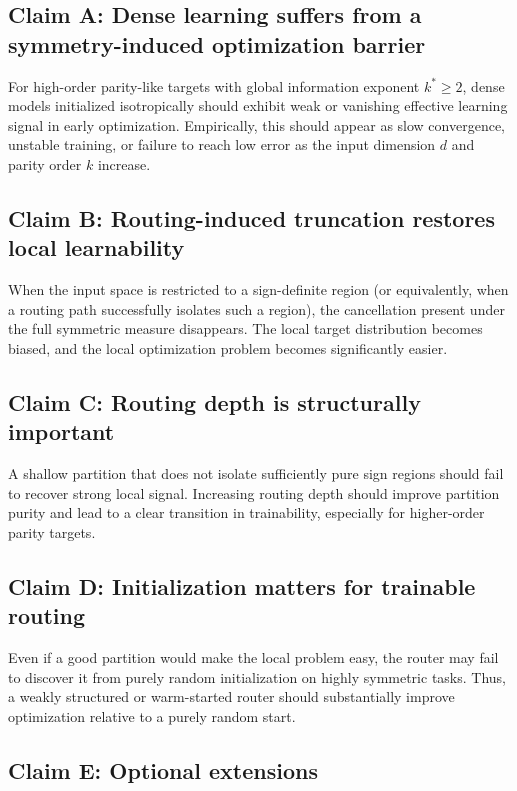 \documentclass[11pt]{article}
\begin{document}
\subsection{Claim A: Dense learning suffers from a symmetry-induced optimization barrier}

For high-order parity-like targets with global information exponent $k^* \ge 2$, dense models initialized isotropically should exhibit weak or vanishing effective learning signal in early optimization. Empirically, this should appear as slow convergence, unstable training, or failure to reach low error as the input dimension $d$ and parity order $k$ increase.

\subsection{Claim B: Routing-induced truncation restores local learnability}

When the input space is restricted to a sign-definite region (or equivalently, when a routing path successfully isolates such a region), the cancellation present under the full symmetric measure disappears. The local target distribution becomes biased, and the local optimization problem becomes significantly easier.

\subsection{Claim C: Routing depth is structurally important}

A shallow partition that does not isolate sufficiently pure sign regions should fail to recover strong local signal. Increasing routing depth should improve partition purity and lead to a clear transition in trainability, especially for higher-order parity targets.

\subsection{Claim D: Initialization matters for trainable routing}

Even if a good partition would make the local problem easy, the router may fail to discover it from purely random initialization on highly symmetric tasks. Thus, a weakly structured or warm-started router should substantially improve optimization relative to a purely random start.

\subsection{Claim E: Optional extensions}
\end{document}

